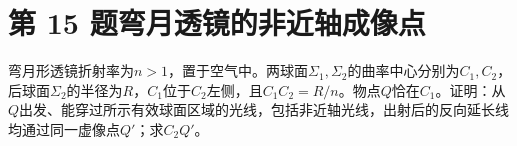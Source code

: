 \documentclass[UTF8,fontset=fandol,a4paper,11pt]{ctexart}
\begin{document}


\section*{第 15 题\quad 弯月透镜的非近轴成像点}\label{q:15}

弯月形透镜折射率为$n>1$，置于空气中。两球面$\Sigma_1,\Sigma_2$的曲率中心分别为$C_1,C_2$，后球面$\Sigma_2$的半径为$R$，$C_1$位于$C_2$左侧，且$C_1C_2=R/n$。物点$Q$恰在$C_1$。证明：从$Q$出发、能穿过所示有效球面区域的光线，包括非近轴光线，出射后的反向延长线均通过同一虚像点$Q'$；求$C_2Q'$。

\begin{center}\begin{minipage}{.97\linewidth}\centering
\begin{tikzpicture}[x=2.2cm,y=2.2cm,font=\small]

\end{tikzpicture}
\end{minipage}
\end{center}
\end{document}
